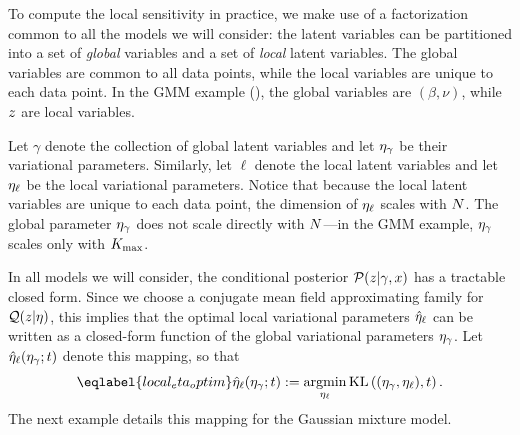 To compute the local sensitivity in practice, we make use of a factorization
common to all the models we will consider: the latent variables can be
partitioned into a set of \textit{global} variables and a set of \textit{local}
latent variables. The global variables are common to all data points, while the
local variables are unique to each data point. In the GMM example
(), the global variables are $(\beta, \nu)$, while $z$
are local variables.

Let $\gamma$ denote the collection of global latent variables and let $\eta_{\gamma}$
be their variational parameters. Similarly, let $\ell$ denote the local latent
variables and let $\eta_{\ell}$ be the local variational parameters. Notice that
because the local latent variables are unique to each data point, the dimension
of $\eta_{\ell}$ scales with $N$. The global parameter $\eta_{\gamma}$ does not scale
directly with $N$---in the GMM example, $\eta_{\gamma}$ scales only with ${K_{\mathrm{max}}}$.

In all models we will consider, the conditional posterior $\mathcal{P}(z \vert
\gamma,x)$ has a tractable closed form.  Since we choose a conjugate mean field
approximating family for $\mathcal{Q}(z \vert \eta)$, this implies that the optimal
local variational parameters $\hat\eta_{\ell}$ can be written as a closed-form
function of the global variational parameters $\eta_{\gamma}$.  Let
$\hat\eta_{\ell}(\eta_\gamma; t)$ denote this mapping, so that
%
\begin{align}\eqlabel{local_eta_optim}
\etaoptlocal(\etaglob; \t) :=
    \argmin_{\etalocal} \KL{(\eta_\gamma, \etalocal), \t}.
\end{align}
%
The next example details this mapping for the Gaussian mixture model.

